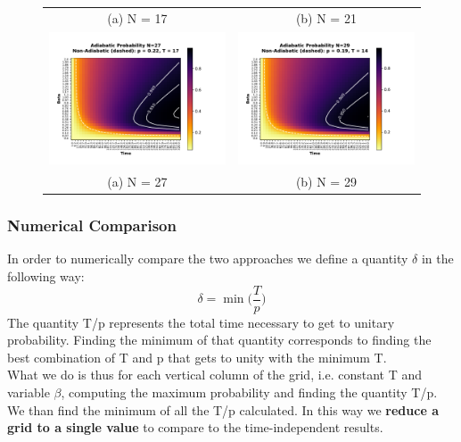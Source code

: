 \documentclass[aps,pra,reprint, onecolumn, showkeys]{revtex4-2}
\begin{document}
\begin{figure}
\begin{tabular}{cc}
(a) N = 17 & (b) N = 21\\[6pt]
\includegraphics[width=90mm]{./figures/27_probability_heatmap.pdf} &   \includegraphics[width=90mm]{./figures/29_probability_heatmap.pdf} \\
(a) N = 27 & (b) N = 29\\[6pt]
\end{tabular}
\end{figure}

\clearpage

\subsubsection{Numerical Comparison}
In order to numerically compare the two approaches we define a quantity $\delta$ in the following way:
\begin{equation}
  \delta = \min\Big(\frac{T}{p}\Big)
\end{equation}
The quantity T/p represents the total time necessary to get to unitary probability. Finding the minimum of that quantity corresponds to finding the best combination of T and p that gets to unity with the minimum T. \\

What we do is thus for each vertical column of the grid, i.e. constant T and variable $\beta$, computing the maximum probability and finding the quantity T/p. We than find the minimum of all the T/p calculated. In this way we \textbf{reduce a grid to a single value} to compare to the time-independent results. \\
\end{document}
